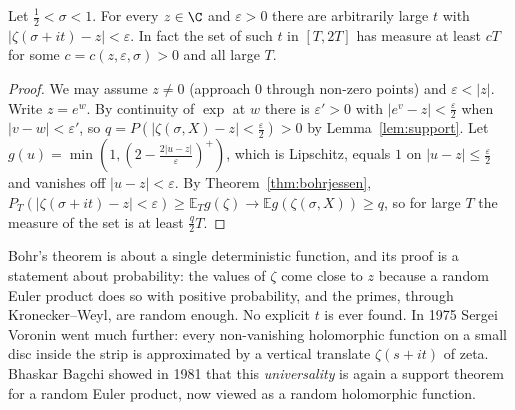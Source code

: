 \begin{corollary}\label{cor:dense}
Let $\frac12<\sigma<1$. For every $z\in\C$ and $\varepsilon>0$ there are arbitrarily large $t$ with $|\zeta(\sigma+it)-z|<\varepsilon$. In fact the set of such $t$ in $[T,2T]$ has measure at least $cT$ for some $c=c(z,\varepsilon,\sigma)>0$ and all large $T$.
\end{corollary}
\begin{proof}
We may assume $z\ne0$ (approach $0$ through non-zero points) and $\varepsilon<|z|$. Write $z=e^w$. By continuity of $\exp$ at $w$ there is $\varepsilon'>0$ with $|e^v-z|<\frac\varepsilon2$ when $|v-w|<\varepsilon'$, so $q=P(|\zeta(\sigma,X)-z|<\frac\varepsilon2)>0$ by Lemma~\ref{lem:support}. Let $g(u)=\min(1,(2-\frac{2|u-z|}\varepsilon)^+)$, which is Lipschitz, equals $1$ on $|u-z|\le\frac\varepsilon2$ and vanishes off $|u-z|<\varepsilon$. By Theorem~\ref{thm:bohrjessen}, $P_T(|\zeta(\sigma+it)-z|<\varepsilon)\ge\mathbb E_Tg(\zeta)\to\mathbb Eg(\zeta(\sigma,X))\ge q$, so for large $T$ the measure of the set is at least $\frac q2T$.
\end{proof}

\begin{beauty}
Bohr's theorem is about a single deterministic function, and its proof is a statement about probability: the values of $\zeta$ come close to $z$ because a random Euler product does so with positive probability, and the primes, through Kronecker--Weyl, are random enough. No explicit $t$ is ever found. In 1975 Sergei Voronin went much further: every non-vanishing holomorphic function on a small disc inside the strip is approximated by a vertical translate $\zeta(s+it)$ of zeta. Bhaskar Bagchi showed in 1981 that this \emph{universality} is again a support theorem for a random Euler product, now viewed as a random holomorphic function.
\end{beauty}

